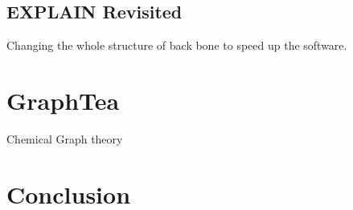 \documentclass[12pt, oneside]{book}
\begin{document}
\section{EXPLAIN Revisited}
Changing the whole structure of back bone to speed up the software.
\chapter{GraphTea}
\cite{2014:07}
\cite{2014:15}
\cite{2014:16}

Chemical Graph theory
\cite{2015:05,2015:06,2015:07,2015:08}

\chapter{Conclusion}
 


\end{document}
